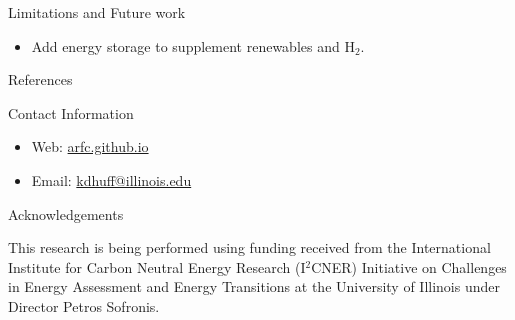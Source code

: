 \documentclass[final]{beamer}
\newlength{\onecolwid}
\begin{document}
\begin{frame}[t]
\begin{columns}
\begin{column}{\onecolwid}
\begin{block}{Limitations and Future work}
\begin{itemize}
    \item Add energy storage to supplement renewables and H$_2$. 
    
    \end{itemize}
\end{block}

\begin{block}{References}
        {\footnotesize 
        }
\end{block}




\begin{alertblock}{Contact Information}
\begin{itemize}
	\item Web: \href{arfc.github.io}{arfc.github.io}
	\item Email: \href{mailto:kdhuff@illinois.edu}{kdhuff@illinois.edu}
\end{itemize}

\end{alertblock}



\begin{block}{Acknowledgements}

This research is being performed using funding received
from the International Institute for Carbon Neutral Energy Research (I$^2$CNER) 
Initiative on Challenges in Energy Assessment and Energy Transitions at  the  
University of Illinois under Director Petros Sofronis.


\end{block}
\end{column}
\end{columns}
\end{frame}
\end{document}
